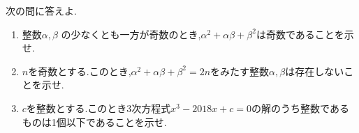 \begin{problem}
次の問に答えよ.
  \begin{enumerate}[(1)\ ]
    \item 整数$\alpha,\beta$ の少なくとも一方が奇数のとき,$\alpha^2+\alpha\beta+\beta^2$は奇数であることを示せ.
    \item $n$を奇数とする.このとき,$\alpha^2+\alpha\beta+\beta^2=2n$をみたす整数$\alpha,\beta$は存在しないことを示せ.
    \item $c$を整数とする.このとき3次方程式$x^3-2018x+c=0$の解のうち整数であるものは1個以下であることを示せ.
  \end{enumerate}
\end{problem}
